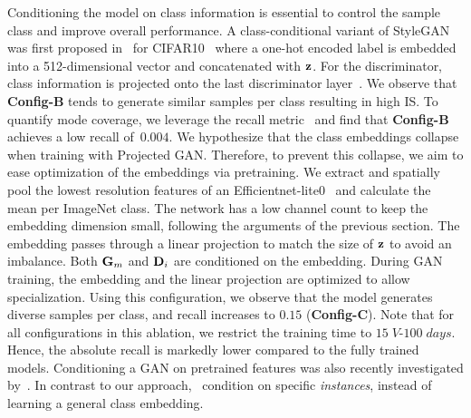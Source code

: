 Conditioning the model on class information is essential to control the sample class and improve overall performance. A class-conditional variant of StyleGAN was first proposed in~\cite{Karras2020NeurIPS} for CIFAR10~\cite{Krizhevsky2009CITESEER} where a one-hot encoded label is embedded into a 512-dimensional vector and concatenated with $\mathbf{z}$. For the discriminator, class information is projected onto the last discriminator layer~\cite{Miyato2018ICLRb}. We observe that \textbf{Config-B} tends to generate similar samples per class resulting in high IS.
To quantify mode coverage, we leverage the recall metric~\cite{Kynknniemi2019NEURIPS} and find that \textbf{Config-B} achieves a low recall of~$0.004$. We hypothesize that the class embeddings collapse when training with Projected GAN. Therefore, to prevent this collapse, we aim to ease optimization of the embeddings via pretraining. We extract and spatially pool the lowest resolution features of an Efficientnet-lite0~\cite{Tan2019ICML} and calculate the mean per ImageNet class. 
The network has a low channel count to keep the embedding dimension small, following the arguments of the previous section. The embedding passes through a linear projection to match the size of $\mathbf{z}$ to avoid an imbalance. Both $\mathbf{G}_m$ and $\mathbf{D}_i$ are conditioned on the embedding.
During GAN training, the embedding and the linear projection are optimized to allow specialization. Using this configuration, we observe that the model generates diverse samples per class, and recall increases to $0.15$ (\textbf{Config-C}). Note that for all configurations in this ablation, we restrict the training time to $15\;V\text{-}100\;days$. Hence, the absolute recall is markedly lower compared to the fully trained models. Conditioning a GAN on pretrained features was also recently investigated by~\cite{Casanova2021NEURIPS}. In contrast to our approach,~\cite{Casanova2021NEURIPS} condition on specific \textit{instances}, instead of learning a general class embedding.

